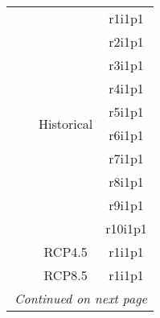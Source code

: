 \begin{table}
\begin{tabular}{m{6cm}m{5cm}cc}
     &  & \multirow{10}{*}{Historical} & r1i1p1 \\
     &  &  & r2i1p1 \\
     &  &  & r3i1p1 \\
     &  &  & r4i1p1 \\
     &  &  & r5i1p1 \\
     &  &  & r6i1p1 \\
     &  &  & r7i1p1 \\
     &  &  & r8i1p1 \\
     &  &  & r9i1p1 \\
     &  &  & r10i1p1 \\ \cline{3-4}
     &  & RCP4.5 & r1i1p1 \\ \cline{3-4}
     &  & RCP8.5 & r1i1p1 \\ \hline
    \hline \multicolumn{4}{r}{\textit{Continued on next page}} \\ \hline
  \end{tabular}
\end{table}
